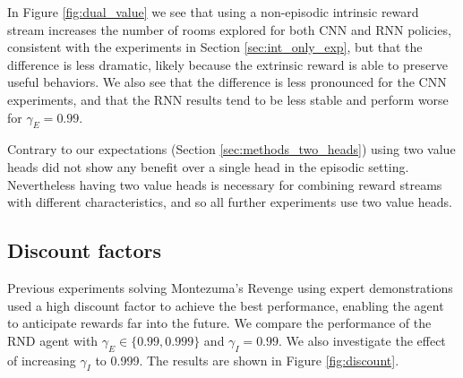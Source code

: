 \documentclass{article} \usepackage[dvipsnames]{xcolor}
\begin{document}
In Figure \ref{fig:dual_value} we see that using a non-episodic intrinsic reward stream increases the number of rooms explored for both CNN and RNN policies, consistent with the experiments in Section \ref{sec:int_only_exp}, but that the difference is less dramatic, likely because the extrinsic reward is able to preserve useful behaviors. We also see that the difference is less pronounced for the CNN experiments, and that the RNN results tend to be less stable and perform worse for $\gamma_E=0.99$.

Contrary to our expectations (Section \ref{sec:methods_two_heads}) using two value heads did not show any benefit over a single head in the episodic setting. Nevertheless having two value heads is necessary for combining reward streams with different characteristics, and so all further experiments use two value heads.
\subsection{Discount factors}
Previous experiments \citep{salimans2018mz, pohlen2018observe,garmulewicz2018expert} solving Montezuma's Revenge using expert demonstrations used a high discount factor to achieve the best performance, enabling the agent to anticipate rewards far into the future. We compare the performance of the RND agent with $\gamma_E \in \{0.99, 0.999 \}$ and $\gamma_I = 0.99$. We also investigate the effect of increasing $\gamma_I$ to 0.999. The results are shown in Figure \ref{fig:discount}.
\end{document}
